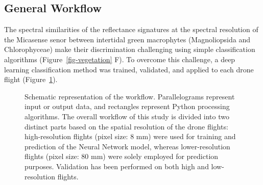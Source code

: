 \documentclass[
  letterpaper,
  11pt,
  english,
  singlespacing,
  headsepline]{MastersDoctoralThesis}
\begin{document}
\begin{spacing}{1.5}
\subsection{General Workflow}\label{general-workflow}

The spectral similarities of the reflectance signatures at the spectral
resolution of the Micasense senor between intertidal green macrophytes
(Magnoliopsida and Chlorophyceae) make their discrimination challenging
using simple classification algorithms (Figure~\ref{fig-vegetation} F).
To overcome this challenge, a deep learning classification method was
trained, validated, and applied to each drone flight
(Figure~\ref{fig-workflow}).

\begin{figure}


\caption{\label{fig-workflow}Schematic representation of the workflow.
Parallelograms represent input or output data, and rectangles represent
Python processing algorithms. The overall workflow of this study is
divided into two distinct parts based on the spatial resolution of the
drone flights: high-resolution flights (pixel size: 8 mm) were used for
training and prediction of the Neural Network model, whereas
lower-resolution flights (pixel size: 80 mm) were solely employed for
prediction purposes. Validation has been performed on both high and
low-resolution flights.}


\end{figure}
\end{spacing}
\end{document}
